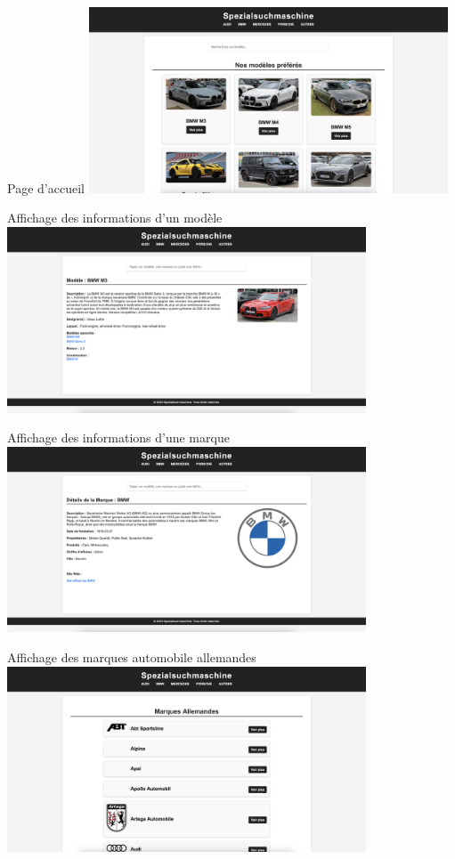 \documentclass[10pt]{beamer}
\begin{document}
\begin{frame}{Page d'accueil}
\centering
\includegraphics[width=0.8\textwidth]{images/index.png}
\end{frame}

\begin{frame}{Affichage des informations d'un modèle}
\centering
\includegraphics[width=0.8\textwidth]{images/modele.png}
\end{frame}

\begin{frame}{Affichage des informations d'une marque}
\centering
\includegraphics[width=0.8\textwidth]{images/marque.png}
\end{frame}

\begin{frame}{Affichage des marques automobile allemandes}
\centering
\includegraphics[width=0.8\textwidth]{images/marques.png}
\end{frame}
\end{document}
